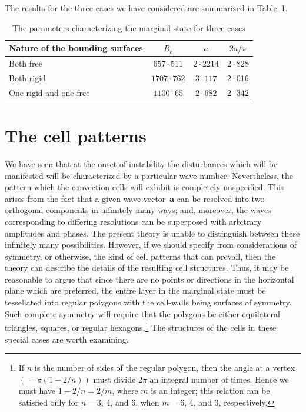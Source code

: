 The results for the three cases we have considered are summarized in
Table~\ref{tab:2-III}.

\begin{table}[htbp]
\centering
\caption{The parameters characterizing the marginal state for three cases}
\label{tab:2-III}
\medskip
\begin{tabular}{@{}l ccc@{}}
\toprule
Nature of the bounding surfaces & $R_c$ & $a$ & $2a/\pi$ \\
\midrule
Both free        & $657{\cdot}511$  & $2{\cdot}2214$ & $2{\cdot}828$ \\
Both rigid       & $1707{\cdot}762$ & $3{\cdot}117$  & $2{\cdot}016$ \\
One rigid and one free & $1100{\cdot}65$  & $2{\cdot}682$  & $2{\cdot}342$ \\
\bottomrule
\end{tabular}
\end{table}

\section{The cell patterns}\label{sec:16}

We have seen that at the onset of instability the disturbances which
will be manifested will be characterized by a particular wave number.
Nevertheless, the pattern which the convection cells will exhibit is
completely unspecified. This arises from the fact that a given wave
vector~$\mathbf{a}$ can be resolved into two orthogonal components in infinitely
many ways; and, moreover, the waves corresponding to differing resolutions
can be superposed with arbitrary amplitudes and phases. The
present theory is unable to distinguish between these infinitely many
possibilities. However, if we should specify from considerations of
symmetry, or otherwise, the kind of cell patterns that can prevail, then
the theory can describe the details of the resulting cell structures. Thus,
it may be reasonable to argue that since there are no points or directions
in the horizontal plane which are preferred, the entire layer in the
marginal state must be tessellated into regular polygons with the cell-walls
being surfaces of symmetry. Such complete symmetry will
require that the polygons be either equilateral triangles, squares, or
regular hexagons.\footnote{If $n$ is the number of sides of the regular polygon, then the angle at a vertex
$(= \pi(1-2/n))$ must divide $2\pi$ an integral number of times. Hence we must have
$1 - 2/n = 2/m$, where $m$ is an integer; this relation can be satisfied only for $n = 3$, 4,
and 6, when $m = 6$, 4, and 3, respectively.} The structures of the cells in these special cases
are worth examining.

